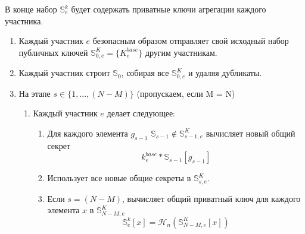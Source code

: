 В конце набор $\mathbb{S}^{k}_{e}$ будет содержать приватные ключи агрегации каждого участника.
\begin{enumerate}
    \item Каждый участник $e$ безопасным образом отправляет свой исходный набор публичных ключей $\mathbb{S}^K_{0,e} = \{K^{base}_e\}$ другим участникам.
    \item Каждый участник строит $\mathbb{S}_{0}$, собирая все $\mathbb{S}^K_{0,e}$ и удаляя дубликаты.
    \item На этапе $s \in \{1,...,(N-M)\}$ (пропускаем, если M = N)
    \begin{enumerate}
        \item Каждый участник $e$ делает следующее:
        \begin{enumerate}
            \item Для каждого элемента $g_{s-1}$ $\mathbb{S}_{s-1} \notin \mathbb{S}^K_{s-1,e}$ вычисляет новый общий секрет \[k^{base}_e*\mathbb{S}_{s-1}[g_{s-1}]\]
            \item Использует все новые общие секреты в $\mathbb{S}^K_{s,e}$.
            \item Если $s = (N-M)$, вычисляет общий приватный ключ для каждого элемента $x$ в $\mathbb{S}^K_{N-M,e}$
            \[\mathbb{S}^{k}_{e}[x] = \mathcal{H}_n(\mathbb{S}^K_{N-M,e}[x])\]


\end{enumerate}
\end{enumerate}
\end{enumerate}
